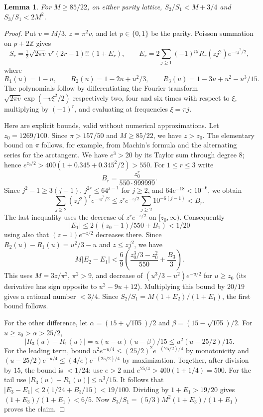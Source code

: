 \documentclass[11pt,a4paper]{article}
\newtheorem{SourceRbjMlemma}{Lemma}
\begin{document}
\begin{SourceRbjMlemma}\label{R19M:lem:gauss}
For $M\ge85/22$, on either parity lattice,
$S_2/S_1<M+3/4$ and $S_3/S_1<2M^2$.
\end{SourceRbjMlemma}
\begin{proof}
Put $v=M/3$, $z=\pi^2 v$, and let $p\in\{0,1\}$ be the parity.
Poisson summation on $p+2\mathbb Z$ gives
\[
 S_r=\tfrac12\sqrt{2\pi v}\,v^r(2r-1)!!\,(1+E_r),\qquad
 E_r=2\sum_{j\ge1}(-1)^{pj}R_r(zj^2)e^{-zj^2/2},
\]
where
\[
 R_1(u)=1-u,\qquad R_2(u)=1-2u+u^2/3,\qquad
 R_3(u)=1-3u+u^2-u^3/15.
\]
The polynomials follow by differentiating the Fourier transform
$\sqrt{2\pi v}\exp(-v\xi^2/2)$ respectively two, four and six
times with respect to $\xi$, multiplying by $(-1)^r$,
and evaluating at frequencies $\xi=\pi j$.

Here are explicit bounds, valid without numerical approximations. Let
$z_0=1269/100$. Since $\pi>157/50$ and $M\ge85/22$, we have
$z>z_0$. The elementary bound on $\pi$ follows, for example, from
Machin's formula and the alternating series for the arctangent.
We have $e^3>20$ by its Taylor sum through degree $8$;
hence $e^{z_0/2}>400(1+0.345+0.345^2/2)>550$.
For $1\le r\le3$ write
\[
 B_r=\frac{z_0^r}{550\cdot999999}.
\]
Since $j^2-1\ge3(j-1)$, $j^{2r}\le64^{j-1}$ for $j\ge2$,
and $64e^{-18}<10^{-6}$, we obtain
\[
 \sum_{j\ge2}(zj^2)^r e^{-zj^2/2}
 \le z^r e^{-z/2}\sum_{j\ge2}10^{-6(j-1)}<B_r.
\]
The last inequality uses the decrease of $z^r e^{-z/2}$ on
$[z_0,\infty)$. Consequently
\[
 |E_1|\le 2((z_0-1)/550+B_1)<1/20
\]
using also that $(z-1)e^{-z/2}$ decreases there.
Since $R_2(u)-R_1(u)=u^2/3-u$ and $z\le zj^2$, we have
\[
 M|E_2-E_1|
 <\frac{6}{9}\left(\frac{z_0^3/3-z_0^2}{550}+\frac{B_3}{3}\right).
\]
This uses $M=3z/\pi^2$, $\pi^2>9$, and decrease of
$(u^3/3-u^2)e^{-u/2}$ for $u\ge z_0$ (its derivative has
sign opposite to $u^2-9u+12$). Multiplying this bound by $20/19$
gives a rational number $<3/4$. Since
$S_2/S_1=M(1+E_2)/(1+E_1)$, the first bound follows.

For the other difference, let $\alpha=(15+\sqrt{105})/2$
and $\beta=(15-\sqrt{105})/2$. For $u\ge z_0>\alpha>25/2$,
\[
 |R_3(u)-R_1(u)|=u(u-\alpha)(u-\beta)/15
 \le u^2(u-25/2)/15.
\]
For the leading term, bound
$u^2e^{-u/4}\le (25/2)^2e^{-(25/2)/4}$ by monotonicity and
$(u-25/2)e^{-u/4}\le (4/e)e^{-(25/2)/4}$ by maximization.
Together, after division by $15$, the bound is $<1/24$:
use $e>2$ and $e^{25/4}>400(1+1/4)=500$.
For the tail use $|R_3(u)-R_1(u)|\le u^3/15$.
It follows that $|E_3-E_1|<2(1/24+B_3/15)<19/100$.
Dividing by $1+E_1>19/20$ gives $(1+E_3)/(1+E_1)<6/5$.
Now $S_3/S_1=(5/3)M^2(1+E_3)/(1+E_1)$ proves the claim.
\end{proof}
\end{document}
